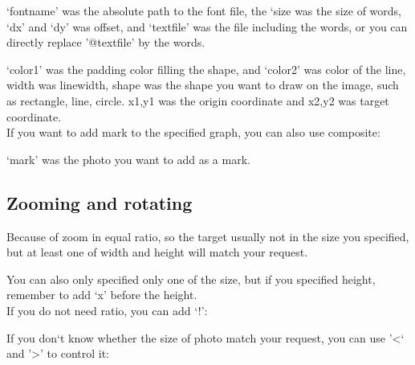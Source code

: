 \documentclass[12pt]{article}
\begin{document}
`fontname' was the absolute path to the font file, the `size was the size of words, `dx' and `dy' was offset, and `textfile' was the file including the words, or you can directly replace '@textfile' by the words.\vspace{5mm}

{\centering{}\par}\vspace{5mm}

`color1' was the padding color filling the shape, and `color2' was color of the line, width was linewidth, shape was the shape you want to draw on the image, such as rectangle, line, circle. x1,y1 was the origin coordinate and x2,y2 was target coordinate.\\

If you want to add mark to the specified graph, you can also use composite:\vspace{5mm}

{\centering{}\par}\vspace{5mm}

`mark' was the photo you want to add as a mark.

\subsection{Zooming and rotating}
{\centering{}\par}\vspace{5mm}

Because of zoom in equal ratio, so the target usually not in the size you specified, but at least one of width and height will match your request.

You can also only specified only one of the size, but if you specified height, remember to add `x' before the height.\\

If you do not need ratio, you can add `!':\vspace{5mm}

{\centering{}\par} \vspace{5mm}

If you don`t know whether the size of photo match your request, you can use '\textless` and '\textgreater' to control it:\vspace{5mm}
\end{document}
